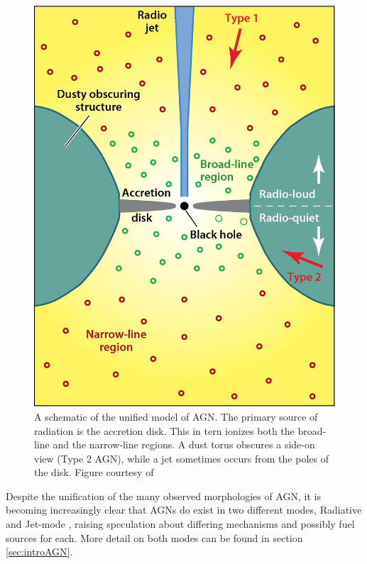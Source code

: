 {{%
\begin{figure}
	\centering
	\includegraphics[width=\textwidth]{introduction/unifiedAGN.jpeg}
	\caption[Schematic of unified model of AGN]{A schematic of the unified model of AGN. The primary source of radiation is the accretion disk. This in tern ionizes both the broad-line and the narrow-line regions. A dust torus obscures a side-on view (Type 2 AGN), while a jet sometimes occurs from the poles of the disk. Figure courtesy of \citet{Heckman2014}}
	\label{fig:introUnifiedAGN}
\end{figure}

Despite the unification of the many observed morphologies of AGN, it is becoming increasingly clear that AGNs do exist in two different modes, Radiative and Jet-mode \citep{Antonucci2012}, raising speculation about differing mechanisms and possibly fuel sources for each. More detail on both modes can be found in section \ref{sec:introAGN}. 

}}
